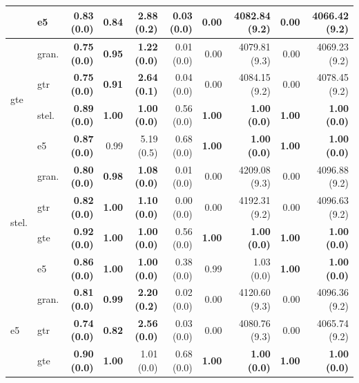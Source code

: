 \begin{table}[!b]
\begin{tabular}{llrrrrrrrr}
         & e5 & \textbf{0.83 {\tiny (0.0)}} & \textbf{0.84} & \textbf{2.88 {\tiny (0.2)}} & 0.03 {\tiny (0.0)} & 0.00 & 4082.84 {\tiny (9.2)} & 0.00 & 4066.42 {\tiny (9.2)} \\
        \midrule
        \multirow{4}{*}{gte} & gran. & \textbf{0.75 {\tiny (0.0)}} & \textbf{0.95} & \textbf{1.22 {\tiny (0.0)}} & 0.01 {\tiny (0.0)} & 0.00 & 4079.81 {\tiny (9.3)} & 0.00 & 4069.23 {\tiny (9.2)} \\
         & gtr & \textbf{0.75 {\tiny (0.0)}} & \textbf{0.91} & \textbf{2.64 {\tiny (0.1)}} & 0.04 {\tiny (0.0)} & 0.00 & 4084.15 {\tiny (9.2)} & 0.00 & 4078.45 {\tiny (9.2)} \\
         & stel. & \textbf{0.89 {\tiny (0.0)}} & \textbf{1.00} & \textbf{1.00 {\tiny (0.0)}} & 0.56 {\tiny (0.0)} & \textbf{1.00} &\textbf{ 1.00 {\tiny (0.0)}} & \textbf{1.00} & \textbf{1.00 {\tiny (0.0)}} \\
         & e5 & \textbf{0.87 {\tiny (0.0)}} & 0.99 & 5.19 {\tiny (0.5)} & 0.68 {\tiny (0.0)} & \textbf{1.00} &\textbf{ 1.00 {\tiny (0.0)}} & \textbf{1.00} & \textbf{1.00 {\tiny (0.0)}} \\
        \midrule
        \multirow{4}{*}{stel.} & gran. & \textbf{0.80 {\tiny (0.0)}} & \textbf{0.98} & \textbf{1.08 {\tiny (0.0)}} & 0.01 {\tiny (0.0)} & 0.00 & 4209.08 {\tiny (9.3)} & 0.00 & 4096.88 {\tiny (9.2)} \\
         & gtr & \textbf{0.82 {\tiny (0.0)}} & \textbf{1.00} & \textbf{1.10 {\tiny (0.0)}} & 0.00 {\tiny (0.0)} & 0.00 & 4192.31 {\tiny (9.2)} & 0.00 & 4096.63 {\tiny (9.2)} \\
         & gte & \textbf{0.92 {\tiny (0.0)}} & \textbf{1.00} & \textbf{1.00 {\tiny (0.0)}} & 0.56 {\tiny (0.0)} & \textbf{1.00} & \textbf{1.00 {\tiny (0.0)}} & \textbf{1.00} & \textbf{1.00 {\tiny (0.0)}} \\
         & e5 & \textbf{0.86 {\tiny (0.0)}} & \textbf{1.00} & \textbf{1.00 {\tiny (0.0)}} & 0.38 {\tiny (0.0)} & 0.99 & 1.03 {\tiny (0.0)} & \textbf{1.00} & \textbf{1.00 {\tiny (0.0)}} \\
        \midrule
        \multirow{4}{*}{e5} & gran. & \textbf{0.81 {\tiny (0.0)}} & \textbf{0.99} & \textbf{2.20 {\tiny (0.2)}} & 0.02 {\tiny (0.0)} & 0.00 & 4120.60 {\tiny (9.3)} & 0.00 & 4096.36 {\tiny (9.2)} \\
         & gtr & \textbf{0.74 {\tiny (0.0)}} & \textbf{0.82} & \textbf{2.56 {\tiny (0.0)}} & 0.03 {\tiny (0.0)} & 0.00 & 4080.76 {\tiny (9.3)} & 0.00 & 4065.74 {\tiny (9.2)} \\
         & gte & \textbf{0.90 {\tiny (0.0)}} & \textbf{1.00} & 1.01 {\tiny (0.0)} & 0.68 {\tiny (0.0)} & \textbf{1.00} & \textbf{1.00 {\tiny (0.0)}} & \textbf{1.00} & \textbf{1.00 {\tiny (0.0)}} \\

\end{tabular}
\end{table}
